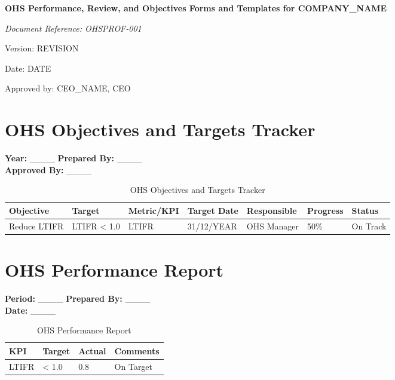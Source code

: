 \documentclass[12pt]{article}
\begin{document}
\begin{titlepage}
    \centering
    \vspace*{2cm}
    {\LARGE\bfseries OHS Performance, Review, and Objectives Forms and Templates for {{COMPANY_NAME}}\par}
    \vspace{1cm}
    {\large\itshape Document Reference: OHSPROF-001\par}
    \vspace{0.5cm}
    {\normalsize Version: {{REVISION}}\par}
    \vspace{0.5cm}
    {\normalsize Date: {{DATE}}\par}
    \vspace{2cm}
    {\normalsize Approved by: {{CEO_NAME}}, CEO\par}
\end{titlepage}

\section{OHS Objectives and Targets Tracker}

\textbf{Year:} \_\_\_\_ \textbf{Prepared By:} \_\_\_\_\\
\textbf{Approved By:} \_\_\_\_

\begin{table}[h]
    \centering
    \begin{tabular}{p{2cm}p{3cm}p{3cm}p{2cm}p{2cm}p{2cm}p{2cm}}
        \toprule
        \textbf{Objective} & \textbf{Target} & \textbf{Metric/KPI} & \textbf{Target Date} & \textbf{Responsible} & \textbf{Progress} & \textbf{Status} \\
        \midrule
        Reduce LTIFR & LTIFR < 1.0 & LTIFR & 31/12/{{YEAR}} & OHS Manager & 50\% & On Track \\
        \bottomrule
    \end{tabular}
    \caption{OHS Objectives and Targets Tracker}
\end{table}

\section{OHS Performance Report}

\textbf{Period:} \_\_\_\_ \textbf{Prepared By:} \_\_\_\_\\
\textbf{Date:} \_\_\_\_

\begin{table}[h]
    \centering
    \begin{tabular}{p{3cm}p{2cm}p{2cm}p{3cm}}
        \toprule
        \textbf{KPI} & \textbf{Target} & \textbf{Actual} & \textbf{Comments} \\
        \midrule
        LTIFR & < 1.0 & 0.8 & On Target \\
        \bottomrule
    \end{tabular}
    \caption{OHS Performance Report}
\end{table}
\end{document}
